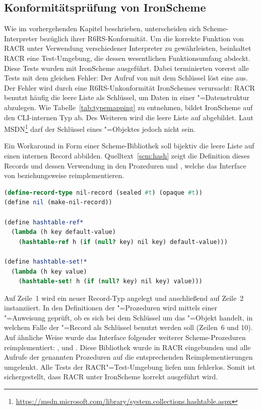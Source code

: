\subsection{Konformitätsprüfung von IronScheme}

Wie im vorhergehenden Kapitel beschrieben, unterscheiden sich Scheme-Interpreter bezüglich ihrer R6RS-Konformität. Um die korrekte Funktion von RACR unter Verwendung verschiedener Interpreter zu gewährleisten, beinhaltet RACR eine Test-Umgebung, die dessen wesentlichen Funktionsumfang abdeckt. Diese Tests wurden mit IronScheme ausgeführt. Dabei terminierten vorerst alle Tests mit dem gleichen Fehler: Der Aufruf von  mit dem Schlüssel  löst eine  aus. Der Fehler wird durch eine R6RS-Unkonformität IronSchemes verursacht: RACR benutzt häufig die leere Liste als Schlüssel, um Daten in einer "=Datenstruktur abzulegen. Wie Tabelle~\ref{tab:typemapping} zu entnehmen, bildet IronScheme  auf den CLI-internen Typ  ab. Des Weiteren wird die leere Liste  auf  abgebildet. Laut MSDN\footnote{ \url{https://msdn.microsoft.com/library/system.collections.hashtable.aspx}} darf der Schlüssel eines "=Objektes jedoch nicht  sein.

Ein Workaround in Form einer Scheme-Bibliothek soll bijektiv die leere Liste auf einen internen Record abbilden. Quelltext~\ref{scm:hash} zeigt die Definition dieses Records und dessen Verwendung in den Prozeduren  und , welche das Interface von  beziehungsweise  reimplementieren.

\begin{lstlisting}[language=scm, caption={\scm{hashtable}"=Workaround}, label=scm:hash]
(define-record-type nil-record (sealed #t) (opaque #t))
(define nil (make-nil-record))

(define hashtable-ref*
  (lambda (h key default-value)
    (hashtable-ref h (if (null? key) nil key) default-value)))

(define hashtable-set!*
  (lambda (h key value)
    (hashtable-set! h (if (null? key) nil key) value)))
\end{lstlisting}

Auf Zeile~1 wird ein neuer Record-Typ angelegt und anschließend auf Zeile~2 instanziiert. In den Definitionen der "=Prozeduren wird mittels einer "=Anweisung geprüft, ob es sich bei dem Schlüssel um das "=Objekt handelt, in welchem Falle der "=Record als Schlüssel benutzt werden soll (Zeilen~6 und 10). Auf ähnliche Weise wurde das Interface folgender weiterer Scheme-Prozeduren reimplementiert: ,  und . Diese Bibliothek wurde in RACR eingebunden und alle Aufrufe der genannten Prozeduren auf die entsprechenden Reimplementierungen umgelenkt. Alle Tests der RACR"=Test-Umgebung liefen nun fehlerlos. Somit ist sichergestellt, dass RACR unter IronScheme korrekt ausgeführt wird.

